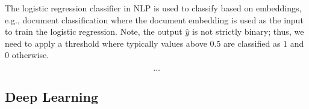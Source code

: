   The logistic regression classifier in NLP is used to classify based on embeddings, e.g., document classification where the document embedding is used as the input to train the logistic regression.
  Note, the output $\hat{y}$ is not strictly binary; thus, we need to apply a threshold where typically values above $0.5$ are classified as $1$ and $0$ otherwise.

  \[\dots\]

\subsection{Deep Learning}

